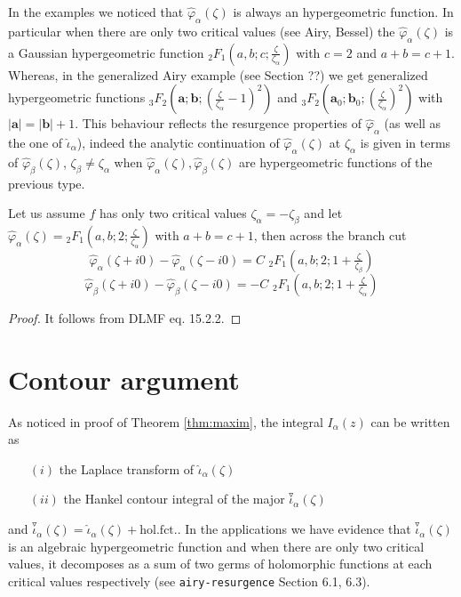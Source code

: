 \documentclass[11pt,a4paper,twoside,leqno,noamsfonts]{amsart}
\numberwithin{equation}{section}
\begin{document}
In the examples we noticed that $\hat{\varphi}_{\alpha}(\zeta)$ is always an hypergeometric function. In particular when there are only two critical values (see Airy, Bessel) the $\hat{\varphi}_{\alpha}(\zeta)$ is a Gaussian hypergeometric function ${}_2F_1\left(a,b;c;\tfrac{\zeta}{\zeta_\alpha}\right)$ with $c=2$ and $a+b=c+1$. Whereas, in the generalized Airy example (see Section ??) we get generalized hypergeometric functions ${}_3F_2\left(\mathbf{a};\mathbf{b};(\tfrac{\zeta}{\zeta_\alpha}-1)^2\right)$ and ${}_3F_2\left(\mathbf{a}_0;\mathbf{b}_0;(\tfrac{\zeta}{\zeta_\alpha})^2\right)$ with $|\mathbf{a}|=|\mathbf{b}|+1$. This behaviour reflects the resurgence properties of $\hat{\varphi}_{\alpha}$ (as well as the one of $\hat
{\iota}_{\alpha}$), indeed the analytic continuation of $\hat{\varphi}_{\alpha}(\zeta)$ at $\zeta_\alpha$ is given in terms of $\hat{\varphi}_{\beta}(\zeta)$, $\zeta_\beta\neq\zeta_\alpha$ when $\hat{\varphi}_{\alpha}(\zeta), \hat{\varphi}_{\beta}(\zeta)$ are hypergeometric functions of the previous type.

\begin{lemma}
Let us assume $f$ has only two critical values $\zeta_\alpha=-\zeta_\beta$ and let $\hat{\varphi}_{\alpha}(\zeta)={}_2F_1(a,b;2;\tfrac{\zeta}{\zeta_\alpha})$ with $a+b=c+1$, then across the branch cut 
\begin{equation}
\hat{\varphi}_{\alpha}(\zeta+i0)-\hat{\varphi}_{\alpha}(\zeta-i0)=C\,\,{}_2F_1\left(a,b;2;1+\tfrac{\zeta}{\zeta_{\beta}}\right)
\end{equation}
\begin{equation}
\hat{\varphi}_{\beta}(\zeta+i0)-\hat{\varphi}_{\beta}(\zeta-i0)=-C\,\,{}_2F_1\left(a,b;2;1+\tfrac{\zeta}{\zeta_{\alpha}}\right)
\end{equation}
\end{lemma}
\begin{proof}
It follows from DLMF eq. 15.2.2. 
\end{proof} 

\section{Contour argument}

As noticed in proof of Theorem \ref{thm:maxim}, the integral $I_{\alpha}(z)$ can be written as 
\begin{enumerate}
\item[$(i)$] the Laplace transform of $\hat{\iota}_{\alpha}(\zeta)$
\item[$(ii)$] the Hankel contour integral of the major $\overset{\triangledown}{\iota}_\alpha(\zeta)$
\end{enumerate}
and $\overset{\triangledown}{\iota}_\alpha(\zeta)=\hat{
\iota}_{\alpha}(\zeta)+\text{hol.fct.}$. In the applications we have evidence that $\overset{\triangledown}{\iota}_\alpha(\zeta)$ is an algebraic hypergeometric function and when there are only two critical values, it decomposes as a sum of two germs of holomorphic functions at each critical values respectively (see {\tt airy-resurgence} Section 6.1, 6.3).



\end{document}
